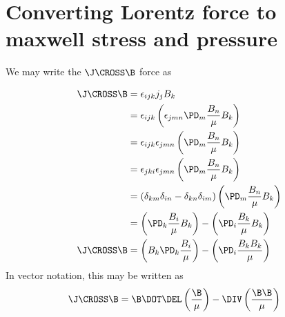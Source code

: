 \documentclass[11pt]{article}
\begin{document}
\doublespacing
\MOONSTITLE
\maketitle

\section{Converting Lorentz force to maxwell stress and pressure}
We may write the $\J\CROSS \B$ force as

\begin{equation}
\begin{aligned}
	\J\CROSS \B
	&= \epsilon_{ijk} j_j B_k \\
	&= \epsilon_{ijk} \left( \epsilon_{jmn} \PD_m \frac{B_n}{\mu} B_k \right) \\
	&= \epsilon_{ijk} \epsilon_{jmn} \left( \PD_m \frac{B_n}{\mu} B_k \right) \\
	&= \epsilon_{jki} \epsilon_{jmn} \left( \PD_m \frac{B_n}{\mu} B_k \right) \\
	&= (\delta_{km} \delta_{in} - \delta_{kn} \delta_{im} ) \left( \PD_m \frac{B_n}{\mu} B_k \right) \\
	&= \left( \PD_k \frac{B_i}{\mu} B_k \right) -
	\left( \PD_i \frac{B_k}{\mu} B_k \right) \\
	\J\CROSS \B &= \left( B_k \PD_k \frac{B_i}{\mu} \right) -
	\left( \PD_i \frac{B_k B_k}{\mu} \right)
\end{aligned}
\end{equation}
In vector notation, this may be written as
\begin{equation}
\begin{aligned}
	\J \CROSS \B
	&= \B \DOT \DEL \left( \frac{\B}{\mu} \right) - \DIV \left( \frac{\B \B}{\mu} \right)
\end{aligned}
\end{equation}
\end{document}
